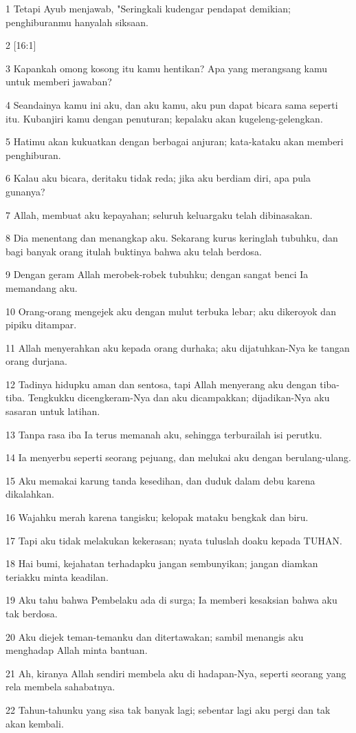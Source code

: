 \par 1 Tetapi Ayub menjawab, "Seringkali kudengar pendapat demikian; penghiburanmu hanyalah siksaan.
\par 2 [16:1]
\par 3 Kapankah omong kosong itu kamu hentikan? Apa yang merangsang kamu untuk memberi jawaban?
\par 4 Seandainya kamu ini aku, dan aku kamu, aku pun dapat bicara sama seperti itu. Kubanjiri kamu dengan penuturan; kepalaku akan kugeleng-gelengkan.
\par 5 Hatimu akan kukuatkan dengan berbagai anjuran; kata-kataku akan memberi penghiburan.
\par 6 Kalau aku bicara, deritaku tidak reda; jika aku berdiam diri, apa pula gunanya?
\par 7 Allah, membuat aku kepayahan; seluruh keluargaku telah dibinasakan.
\par 8 Dia menentang dan menangkap aku. Sekarang kurus keringlah tubuhku, dan bagi banyak orang itulah buktinya bahwa aku telah berdosa.
\par 9 Dengan geram Allah merobek-robek tubuhku; dengan sangat benci Ia memandang aku.
\par 10 Orang-orang mengejek aku dengan mulut terbuka lebar; aku dikeroyok dan pipiku ditampar.
\par 11 Allah menyerahkan aku kepada orang durhaka; aku dijatuhkan-Nya ke tangan orang durjana.
\par 12 Tadinya hidupku aman dan sentosa, tapi Allah menyerang aku dengan tiba-tiba. Tengkukku dicengkeram-Nya dan aku dicampakkan; dijadikan-Nya aku sasaran untuk latihan.
\par 13 Tanpa rasa iba Ia terus memanah aku, sehingga terburailah isi perutku.
\par 14 Ia menyerbu seperti seorang pejuang, dan melukai aku dengan berulang-ulang.
\par 15 Aku memakai karung tanda kesedihan, dan duduk dalam debu karena dikalahkan.
\par 16 Wajahku merah karena tangisku; kelopak mataku bengkak dan biru.
\par 17 Tapi aku tidak melakukan kekerasan; nyata tuluslah doaku kepada TUHAN.
\par 18 Hai bumi, kejahatan terhadapku jangan sembunyikan; jangan diamkan teriakku minta keadilan.
\par 19 Aku tahu bahwa Pembelaku ada di surga; Ia memberi kesaksian bahwa aku tak berdosa.
\par 20 Aku diejek teman-temanku dan ditertawakan; sambil menangis aku menghadap Allah minta bantuan.
\par 21 Ah, kiranya Allah sendiri membela aku di hadapan-Nya, seperti seorang yang rela membela sahabatnya.
\par 22 Tahun-tahunku yang sisa tak banyak lagi; sebentar lagi aku pergi dan tak akan kembali.

